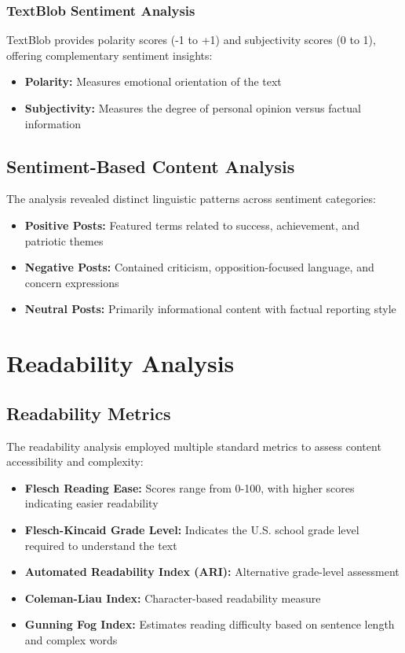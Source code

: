 \documentclass[12pt,a4paper]{article}
\begin{document}
\subsubsection{TextBlob Sentiment Analysis}
TextBlob provides polarity scores (-1 to +1) and subjectivity scores (0 to 1), offering complementary sentiment insights:

\begin{itemize}
    \item \textbf{Polarity:} Measures emotional orientation of the text
    \item \textbf{Subjectivity:} Measures the degree of personal opinion versus factual information
\end{itemize}

\subsection{Sentiment-Based Content Analysis}

The analysis revealed distinct linguistic patterns across sentiment categories:

\begin{itemize}
    \item \textbf{Positive Posts:} Featured terms related to success, achievement, and patriotic themes
    \item \textbf{Negative Posts:} Contained criticism, opposition-focused language, and concern expressions  
    \item \textbf{Neutral Posts:} Primarily informational content with factual reporting style
\end{itemize}

\section{Readability Analysis}

\subsection{Readability Metrics}

The readability analysis employed multiple standard metrics to assess content accessibility and complexity:

\begin{itemize}
    \item \textbf{Flesch Reading Ease:} Scores range from 0-100, with higher scores indicating easier readability
    \item \textbf{Flesch-Kincaid Grade Level:} Indicates the U.S. school grade level required to understand the text
    \item \textbf{Automated Readability Index (ARI):} Alternative grade-level assessment
    \item \textbf{Coleman-Liau Index:} Character-based readability measure
    \item \textbf{Gunning Fog Index:} Estimates reading difficulty based on sentence length and complex words
\end{itemize}
\end{document}

